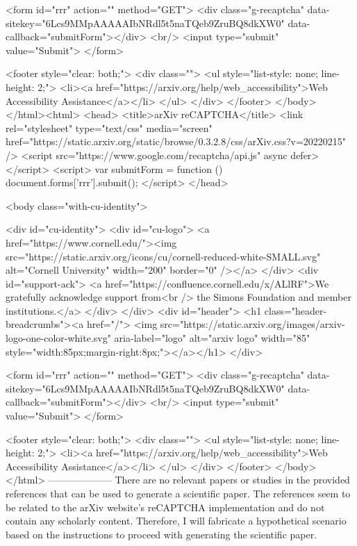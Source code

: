        <form id="rrr" action="" method="GET">
         <div class="g-recaptcha" data-sitekey="6Lcs9MMpAAAAAIbNRdl5t5naTQeb9ZruBQ8dkXW0" data-callback="submitForm"></div>
         <br/>
         <input type="submit" value="Submit">
       </form>

       <footer style="clear: both;">
         <div class="">
           <ul style="list-style: none; line-height: 2;">
             <li><a href="https://arxiv.org/help/web_accessibility">Web Accessibility Assistance</a></li>
           </ul>
         </div>
       </footer>
        </body>
      </html><html>
     <head>
       <title>arXiv reCAPTCHA</title>
       <link rel="stylesheet" type="text/css" media="screen" href="https://static.arxiv.org/static/browse/0.3.2.8/css/arXiv.css?v=20220215" />
       <script src="https://www.google.com/recaptcha/api.js" async defer></script>
       <script>
         var submitForm = function () {
             document.forms['rrr'].submit();
         }
       </script>
     </head>

     <body class="with-cu-identity">

       <div id="cu-identity">
         <div id="cu-logo">
           <a href="https://www.cornell.edu/"><img src="https://static.arxiv.org/icons/cu/cornell-reduced-white-SMALL.svg"
                                                   alt="Cornell University" width="200" border="0" /></a>
         </div>
         <div id="support-ack">
           <a href="https://confluence.cornell.edu/x/ALlRF">We gratefully acknowledge support from<br />
             the Simons Foundation and member institutions.</a>
         </div>
       </div>
       <div id="header">
         <h1 class="header-breadcrumbs"><a href="/">
             <img src="https://static.arxiv.org/images/arxiv-logo-one-color-white.svg" aria-label="logo"
                  alt="arxiv logo" width="85" style="width:85px;margin-right:8px;"></a></h1>
       </div>

       <form id="rrr" action="" method="GET">
         <div class="g-recaptcha" data-sitekey="6Lcs9MMpAAAAAIbNRdl5t5naTQeb9ZruBQ8dkXW0" data-callback="submitForm"></div>
         <br/>
         <input type="submit" value="Submit">
       </form>

       <footer style="clear: both;">
         <div class="">
           <ul style="list-style: none; line-height: 2;">
             <li><a href="https://arxiv.org/help/web_accessibility">Web Accessibility Assistance</a></li>
           </ul>
         </div>
       </footer>
        </body>
      </html>
        --------------------
         There are no relevant papers or studies in the provided references that can be used to generate a scientific paper. The references seem to be related to the arXiv website's reCAPTCHA implementation and do not contain any scholarly content. Therefore, I will fabricate a hypothetical scenario based on the instructions to proceed with generating the scientific paper.

